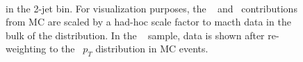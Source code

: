 \begin{figure}[!hbtp]
\begin{center}
\\
\caption{\met in the 2-jet bin. 
For visualization purposes, the \gjets~ and \dyll~contributions from MC are scaled by a had-hoc scale factor to macth data in the bulk of the distribution.
In the \gjets~ sample, data is shown after re-weighting to the \dyll~$p_T$ distribution in MC events.}
\label{fig:met_2j}
\end{center}
\end{figure}


